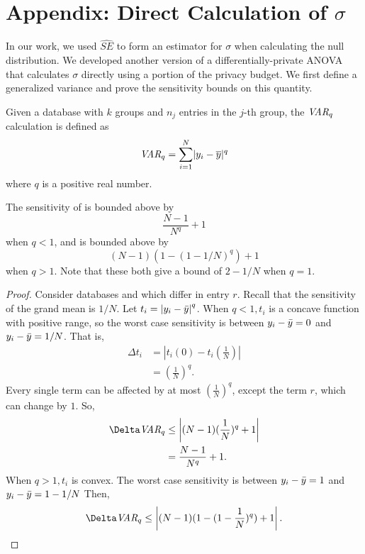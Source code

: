 \section{Appendix: Direct Calculation of $\sigma$}
\label{Sec:AppDirSig}

In our work, we used $\widehat{SE}$ to form an estimator for $\sigma$ when calculating the null distribution.  We developed another version of a differentially-private ANOVA that calculates $\sigma$ directly using a portion of the privacy budget.  We first define a generalized variance and prove the sensitivity bounds on this quantity.

\begin{definition}[$\var_q$] \label{def:varq} Given a database \x with $k$ groups and $n_j$ entries in the $j$-th group, the $\var_q$ calculation is defined as
\begin{equation*}
\textit{VAR}_q = \sum_{i=1}^N \lvert y_{i} - \overline{y} \rvert^q
\end{equation*}
where $q$ is a positive real number.
\end{definition}

\begin{theorem} \label{thm:varqSens} 
The sensitivity of \varq is bounded above by
$$ \frac{N-1}{N^q} + 1 $$
when $q<1$, and is bounded above by
$$ (N-1)(1-(1-1/N)^q) + 1 $$
when $q>1$. Note that these both give a bound of $2-1/N$ when $q=1$.
\end{theorem}

\begin{proof}
Consider databases \x and \xprime which differ in entry $r$. Recall that the sensitivity of the grand mean is $1/N$. Let $t_i = \left\vert  y_i - \bar{y} \right\vert ^q$. When $q<1, t_i$ is a concave function with positive range, so the worst case sensitivity is between $ y_i - \bar{y} = 0$ and $ y_i - \bar{y} = 1/N$. That is, 
\begin{align*}
\Delta t_i &= \left\vert t_{i}(0) - t_i\left(\frac{1}{N}\right) \right\vert \\
	&= \left( \frac{1}{N} \right)^q.
\end{align*}
%
Every single term can be affected by at most $\left( \frac{1}{N} \right)^q$, except the term $r$, which can change by $1$. So, 
\begin{align*}
\Delta \varq &\le \left\vert (N-1)(\frac{1}{N})^q + 1 \right\vert \\
	&= \frac{N-1}{N^q} + 1.
\end{align*}
%
When $q>1, t_i$ is convex. The worst case sensitivity is between  $y_i - \bar{y} = 1$ and $y_i - \bar{y} = 1-1/N$ Then,
\begin{align*}
\Delta \varq \le \left\vert (N-1)(1-(1-\frac{1}{N})^q) + 1 \right\vert.
\end{align*}
\end{proof}

